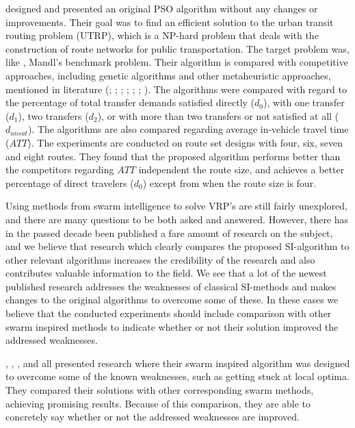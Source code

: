 \citet{kechagiopoulos14} designed and presented an original PSO algorithm without any changes or improvements. Their goal was to find an efficient solution to the urban transit routing problem (UTRP), which is a NP-hard problem that deals with the construction of route networks for public transportation. The target problem was, like \citet{nikolic14}, Mandl's benchmark problem. Their algorithm is compared with competitive approaches, including genetic algorithms and other metaheuristic approaches, mentioned in literature (\citet{baaj91}; \citet{chakroborty02}; \citet{kidwai98}; \citet{fan10}; \citet{fan09-2}; \citet{zhang10}; \citet{chew12}). The algorithms were compared with regard to the percentage of total transfer demands satisfied directly ($d_0$), with one transfer ($d_1$), two transfers ($d_2$), or with more than two transfers or not satisfied at all ($d_{unsat}$). The algorithms are also compared regarding average in-vehicle travel time ($ATT$). The experiments are conducted on route set designs with four, six, seven and eight routes. They found that the proposed algorithm performs better than the competitors regarding $ATT$ independent the route size, and achieves a better percentage of direct travelers ($d_0$) except from when the route size is four.  \newline

Using methods from swarm intelligence to solve VRP's are still fairly unexplored, and there are many questions to be both asked and answered. However, there has in the passed decade been published a fare amount of research on the subject, and we believe that research which clearly compares the proposed SI-algorithm to other relevant algorithms increases the credibility of the research and also contributes valuable information to the field. We see that a lot of the newest published research addresses the weaknesses of classical SI-methods and makes changes to the original algorithms to overcome some of these. In these cases we believe that the conducted experiments should include comparison with other swarm inspired methods to indicate whether or not their solution improved the addressed weaknesses. 

\citet{tripathi09}, \citet{yang07}, \citet{salehinejad10}, and \citet{jiang10} all presented research where their swarm inspired algorithm was designed to overcome some of the known weaknesses, such as getting stuck at local optima. They compared their solutions with other corresponding swarm methods, achieving promising results. Because of this comparison, they are able to concretely say whether or not the addressed weaknesses are improved. 

